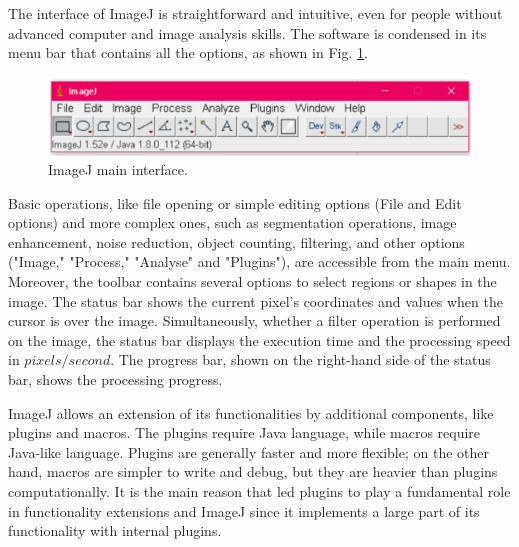 \documentclass[twocolumn]{svjour3}           %
\begin{document}
The interface of ImageJ is straightforward and intuitive, even for people without advanced computer and image analysis skills. 
The software is condensed in its menu bar that contains all the options, as shown in Fig. \ref{ImageJ_Interf}.

\begin{figure}[!t]
	\centerline{\includegraphics[scale=0.37]{fig_imagej}}
	\caption{ImageJ main interface.}
	\label{ImageJ_Interf}
\end{figure}
Basic operations, like file opening or simple editing options (File and Edit options) and more complex ones, such as segmentation operations, image enhancement, noise reduction, object counting, filtering, and other options ("Image," "Process," "Analyse" and "Plugins"), are accessible from the main menu.
Moreover, the toolbar contains several options to select regions or shapes in the image. 
The status bar shows the current pixel's coordinates and values when the cursor is over the image. Simultaneously, whether a filter operation is performed on the image, the status bar displays the execution time and the processing speed in $pixels / second$.
The progress bar, shown on the right-hand side of the status bar, shows the processing progress.

ImageJ allows an extension of its functionalities by additional components, like plugins and macros. The plugins require Java language, while macros require Java-like language. Plugins are generally faster and more flexible; on the other hand, macros are simpler to write and debug, but they are heavier than plugins computationally. It is the main reason that led plugins to play a fundamental role in functionality extensions and ImageJ since it implements a large part of its functionality with internal plugins.
\end{document}
